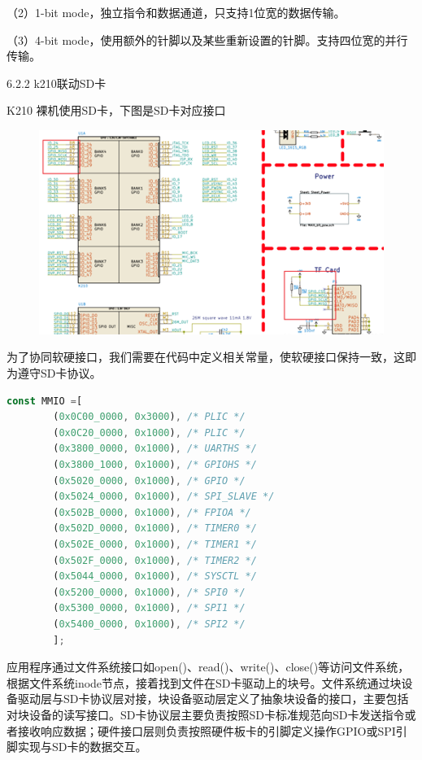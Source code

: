 （2）1-bit mode，独立指令和数据通道，只支持1位宽的数据传输。

（3）4-bit mode，使用额外的针脚以及某些重新设置的针脚。支持四位宽的并行传输。

6.2.2 k210联动SD卡

K210 裸机使用SD卡，下图是SD卡对应接口
\begin{figure}[H]
    \centering
    \includegraphics{figures/06-02-接口标.png}
\end{figure}

为了协同软硬接口，我们需要在代码中定义相关常量，使软硬接口保持一致，这即为遵守SD卡协议。
\begin{lstlisting}[language={Rust}, label={code:inode},
	caption={SD卡协议}]
    const MMIO =[
        (0x0C00_0000, 0x3000), /* PLIC */
        (0x0C20_0000, 0x1000), /* PLIC */
        (0x3800_0000, 0x1000), /* UARTHS */
        (0x3800_1000, 0x1000), /* GPIOHS */
        (0x5020_0000, 0x1000), /* GPIO */
        (0x5024_0000, 0x1000), /* SPI_SLAVE */
        (0x502B_0000, 0x1000), /* FPIOA */
        (0x502D_0000, 0x1000), /* TIMER0 */
        (0x502E_0000, 0x1000), /* TIMER1 */
        (0x502F_0000, 0x1000), /* TIMER2 */
        (0x5044_0000, 0x1000), /* SYSCTL */
        (0x5200_0000, 0x1000), /* SPI0 */
        (0x5300_0000, 0x1000), /* SPI1 */
        (0x5400_0000, 0x1000), /* SPI2 */
        ];
\end{lstlisting}


应用程序通过文件系统接口如open()、read()、write()、close()等访问文件系统，根据文件系统inode节点，接着找到文件在SD卡驱动上的块号。文件系统通过块设备驱动层与SD卡协议层对接，块设备驱动层定义了抽象块设备的接口，主要包括对块设备的读写接口。SD卡协议层主要负责按照SD卡标准规范向SD卡发送指令或者接收响应数据；硬件接口层则负责按照硬件板卡的引脚定义操作GPIO或SPI引脚实现与SD卡的数据交互。

